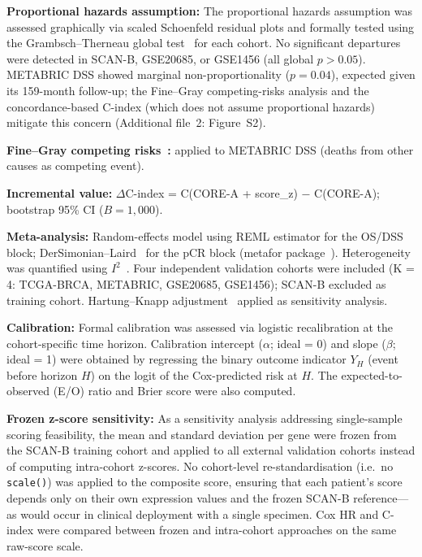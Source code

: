 \documentclass[referee,lineno,pdflatex,sn-vancouver-num]{sn-jnl}
\begin{document}
\textbf{Proportional hazards assumption:} The proportional hazards assumption was assessed graphically via scaled Schoenfeld residual plots and formally tested using the Grambsch--Therneau global test~\cite{grambsch1994} for each cohort. No significant departures were detected in SCAN-B, GSE20685, or GSE1456 (all global $p > 0.05$). METABRIC DSS showed marginal non-proportionality ($p = 0.04$), expected given its 159-month follow-up; the Fine--Gray competing-risks analysis and the concordance-based C-index (which does not assume proportional hazards) mitigate this concern (Additional file~2: Figure~S2).

\textbf{Fine--Gray competing risks~\cite{fine1999}:} applied to METABRIC DSS (deaths from other causes as competing event).

\textbf{Incremental value:} $\Delta$C-index = C(CORE-A + score\_z) $-$ C(CORE-A); bootstrap 95\% CI ($B = 1{,}000$).

\textbf{Meta-analysis:} Random-effects model using REML estimator for the OS/DSS block; DerSimonian--Laird~\cite{dersimonian1986} for the pCR block (metafor package~\cite{viechtbauer2010}). Heterogeneity was quantified using $I^2$~\cite{higgins2003}. Four independent validation cohorts were included (K = 4: TCGA-BRCA, METABRIC, GSE20685, GSE1456); SCAN-B excluded as training cohort. Hartung--Knapp adjustment~\cite{hartung2001} applied as sensitivity analysis.

\textbf{Calibration:} Formal calibration was assessed via logistic recalibration at the cohort-specific time horizon. Calibration intercept ($\alpha$; ideal = 0) and slope ($\beta$; ideal = 1) were obtained by regressing the binary outcome indicator $Y_H$ (event before horizon $H$) on the logit of the Cox-predicted risk at $H$. The expected-to-observed (E/O) ratio and Brier score were also computed.

\textbf{Frozen z-score sensitivity:} As a sensitivity analysis addressing single-sample scoring feasibility, the mean and standard deviation per gene were frozen from the SCAN-B training cohort and applied to all external validation cohorts instead of computing intra-cohort z-scores. No cohort-level re-standardisation (i.e.\ no \texttt{scale()}) was applied to the composite score, ensuring that each patient's score depends only on their own expression values and the frozen SCAN-B reference---as would occur in clinical deployment with a single specimen. Cox HR and C-index were compared between frozen and intra-cohort approaches on the same raw-score scale.
\end{document}
